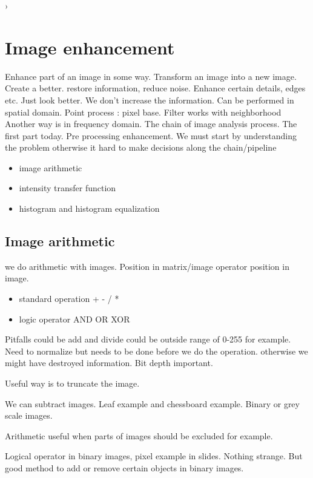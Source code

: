 ›
\section{Image enhancement}
Enhance part of an image in some way. Transform an image into a new image. Create a better. restore information, reduce noise.
Enhance certain details, edges etc. Just look better. 
We don't increase the information. Can be performed in spatial domain. Point process : pixel base. Filter works with neighborhood
Another way is in frequency domain. 
The chain of image analysis process. The first part today. Pre processing enhancement. We must start by understanding the problem otherwise it hard to make decisions along the chain/pipeline


\begin{itemize}
    \item image arithmetic
    \item intensity transfer function
    \item histogram and histogram equalization
\end{itemize}


\subsection*{Image arithmetic}
we do arithmetic with images. Position in matrix/image operator position in image. 

\begin{itemize}
    \item standard operation + - / *
    \item logic operator AND OR XOR
\end{itemize}

Pitfalls could be add and divide could be outside range of 0-255 for example. Need to normalize but needs to be done before we do the operation. otherwise we might have destroyed information. Bit depth important. 

Useful way is to truncate the image. 

We can subtract images. Leaf example and chessboard example. Binary or grey scale images. 

Arithmetic useful when parts of images should be excluded for example.

Logical operator in binary images, pixel example in slides. Nothing strange. But good method to add or remove certain objects in binary images. 

